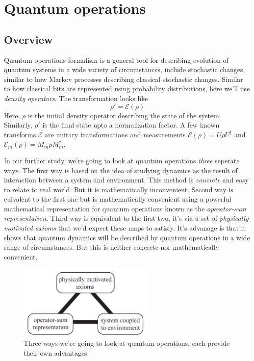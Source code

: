 \section{Quantum operations}
\subsection{Overview}
Quantum operations formalism is a general tool for describing evolution of quantum systems in a wide variety of circumstances, include stochastic changes, similar to how Markov processes describing classical stochastic changes. Similar to how classical bits are represented using probability distributions, here we'll use \textit{density operators}. The transformation looks like
\begin{equation}
    \rho' = \mathcal{E} (\rho)
\end{equation}
Here, $\rho$ is the initial density operator describing the state of the system. Similarly, $\rho'$ is the final state upto a normalization factor. A few known transforms $\mathcal{E}$ are unitary transformations and measurements $\mathcal{E}(\rho) = U\rho U^\dag$ and $\mathcal{E}_m(\rho) = M_m\rho M_m^\dag$.

In our further study, we're going to look at quantum operations \textit{three} seperate ways. The first way is based on the idea of studying dynamics as the result of interaction between a system and environment. This method is \textit{concrete} and easy to relate to real world. But it is mathematically inconvenient. Second way is euivalent to the first one but is mathematically convenient using a powerful mathematical representation for quantum operations known as the \textit{operator-sum representation}. Third way is equivalent to the first two, it's via a set of \textit{physically motivated axioms} that we'd expect these maps to satisfy. It's advanage is that it shows that quantum dynamics will be described by quantum operations in a wide range of circumstances. But this is neither concrete nor mathematically convenient. 
\begin{figure}[H]
    \centering
    \includegraphics[width=0.6\textwidth]{images/quantum_operations.png}
    \caption{Three ways we're going to look at quantum operations, each provide their own advantages}
    \label{fig:quantum_operations}
\end{figure}

